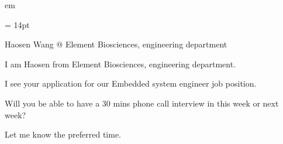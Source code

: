 

 em

\FFrf \baselineskip = 14pt



\centerline{
Haosen Wang @ Element Biosciences, engineering department
} 

\par I am Haosen from Element Biosciences, engineering department.
\par I see your application for our Embedded system engineer job position.
\par Will you be able to have a 30 mins phone call interview in this week or next week?
\par Let me know the preferred time.

\vfill 

